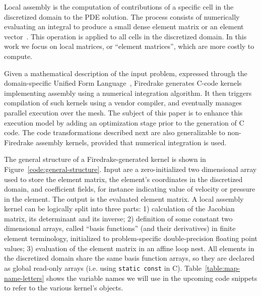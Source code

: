 \documentclass[conference]{IEEEtran}
\begin{document}
Local assembly is the computation of contributions of a specific cell in the discretized domain to the PDE solution. The process consists of numerically evaluating an integral to produce a small dense element matrix or an element vector~\cite{quadrature1, fluidity_manual_v4}. This operation is applied to all cells in the discretized domain. In this work we focus on local matrices, or ``element matrices'', which are more costly to compute.

Given a mathematical description of the input problem, expressed through the domain-specific Unified Form Language~\cite{ufl}, Firedrake generates C-code kernels implementing assembly using a numerical integration algorithm. It then triggers compilation of such kernels using a vendor compiler, and eventually manages parallel execution over the mesh. The subject of this paper is to enhance this execution model by adding an optimization stage prior to the generation of C code. The code transformations described next are also generalizable to non-Firedrake assembly kernels, provided that numerical integration is used.

The general structure of a Firedrake-generated kernel is shown in Figure~\ref{code:general-structure}. Input are a zero-initialized two dimensional array used to store the element matrix, the element's coordinates in the discretized domain, and coefficient fields, for instance indicating value of velocity or pressure in the element. The output is the evaluated element matrix. A local assembly kernel can be logically split into three parts: 1) calculation of the Jacobian matrix, its determinant and its inverse; 2) definition of some constant two dimensional arrays, called ``basis functions'' (and their derivatives) in finite element terminology, initialized to problem-specific double-precision floating point values; 3) evaluation of the element matrix in an affine loop nest. All elements in the discretized domain share the same basis function arrays, so they are declared as global read-only arrays (i.e. using \texttt{static const} in C). Table~\ref{table:map-name-letters} shows the variable names we will use in the upcoming code snippets to refer to the various kernel's objects.
\end{document}
